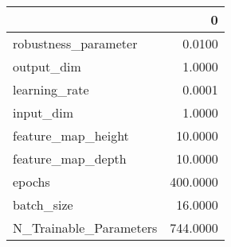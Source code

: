 \begin{tabular}{lr}
\toprule
{} &         0 \\
\midrule
robustness\_parameter   &    0.0100 \\
output\_dim             &    1.0000 \\
learning\_rate          &    0.0001 \\
input\_dim              &    1.0000 \\
feature\_map\_height     &   10.0000 \\
feature\_map\_depth      &   10.0000 \\
epochs                 &  400.0000 \\
batch\_size             &   16.0000 \\
N\_Trainable\_Parameters &  744.0000 \\
\bottomrule
\end{tabular}
